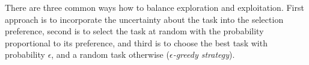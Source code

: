 There are three common ways how to balance exploration and exploitation.
First approach is to incorporate the uncertainty about the task into the selection
preference, %
second is to select the task at random with the probability proportional to its
preference, %
and third is to choose the best task with probability $\epsilon$, and
a random task otherwise (\emph{$\epsilon$-greedy strategy}).






